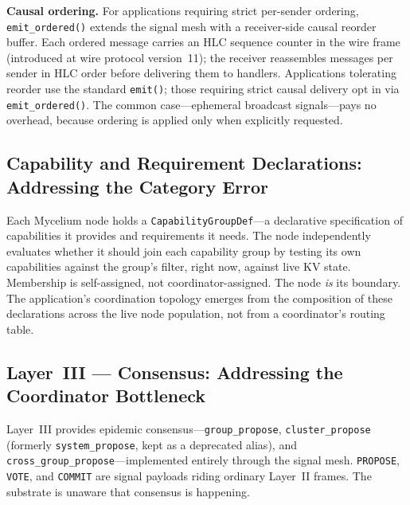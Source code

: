 \documentclass[11pt]{article}
\begin{document}
\textbf{Causal ordering.} For applications requiring strict per-sender ordering,
\texttt{emit\_ordered()} extends the signal mesh with a receiver-side causal
reorder buffer. Each ordered message carries an HLC sequence counter in the wire
frame (introduced at wire protocol version~11); the receiver reassembles messages
per sender in HLC order before delivering them to handlers. Applications tolerating
reorder use the standard \texttt{emit()}; those requiring strict causal delivery
opt in via \texttt{emit\_ordered()}. The common case---ephemeral broadcast
signals---pays no overhead, because ordering is applied only when explicitly requested.

\subsection{Capability and Requirement Declarations: Addressing the Category Error}

Each Mycelium node holds a \texttt{CapabilityGroupDef}---a declarative
specification of capabilities it provides and requirements it needs. The node
independently evaluates whether it should join each capability group by testing its
own capabilities against the group's filter, right now, against live KV state.
Membership is self-assigned, not coordinator-assigned. The node \emph{is} its
boundary. The application's coordination topology emerges from the composition of
these declarations across the live node population, not from a coordinator's
routing table.

\subsection{Layer~III --- Consensus: Addressing the Coordinator Bottleneck}

Layer~III provides epidemic consensus---\texttt{group\_propose},
\texttt{cluster\_propose} (formerly \texttt{system\_propose}, kept as a deprecated alias), and \texttt{cross\_group\_propose}---implemented entirely
through the signal mesh. \texttt{PROPOSE}, \texttt{VOTE}, and \texttt{COMMIT} are
signal payloads riding ordinary Layer~II frames. The substrate is unaware that
consensus is happening.
\end{document}
